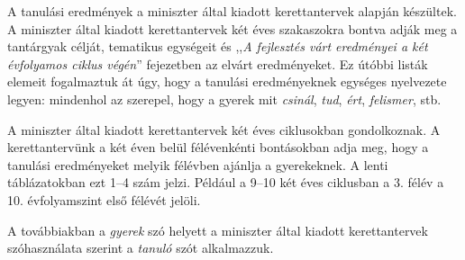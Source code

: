 \documentclass[10pt,twoside]{book}
\begin{document}
A tanulási eredmények a miniszter által kiadott kerettantervek \cite{ofi:kerettanterv} alapján készültek. A miniszter által kiadott kerettantervek két éves szakaszokra bontva adják meg a tantárgyak célját, tematikus egységeit és ,,\emph{A fejlesztés várt eredményei a két évfolyamos ciklus végén}'' fejezetben az elvárt eredményeket. Ez útóbbi listák elemeit fogalmaztuk át úgy, hogy a tanulási eredményeknek egységes nyelvezete legyen: mindenhol az szerepel, hogy a gyerek mit \emph{csinál}, \emph{tud}, \emph{ért}, \emph{felismer}, stb.

A miniszter által kiadott kerettantervek két éves ciklusokban gondolkoznak. A kerettantervünk a két éven belül félévenkénti bontásokban adja meg, hogy a tanulási eredményeket melyik félévben ajánlja a gyerekeknek. A lenti táblázatokban ezt 1--4 szám jelzi. Például a 9--10 két éves ciklusban a 3. félév a 10. évfolyamszint első félévét jelöli.

A továbbiakban a \emph{gyerek} szó helyett a miniszter által kiadott kerettantervek szóhasználata szerint a \emph{tanuló} szót alkalmazzuk.



{}
\label{sec:bibliographyk}

\end{document}
